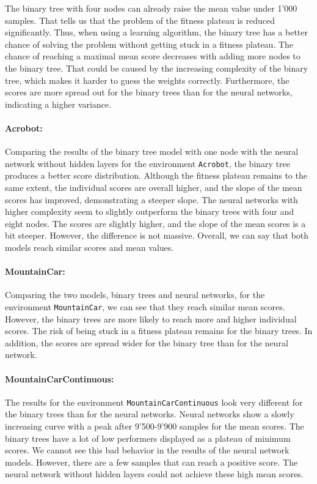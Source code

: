 The binary tree with four nodes can already raise the mean value under 1'000 samples. That tells us that the problem of the fitness plateau is reduced significantly. Thus, when using a learning algorithm, the binary tree has a better chance of solving the problem without getting stuck in a fitness plateau. The chance of reaching a maximal mean score decreases with adding more nodes to the binary tree. That could be caused by the increasing complexity of the binary tree, which makes it harder to guess the weights correctly. Furthermore, the scores are more spread out for the binary trees than for the neural networks, indicating a higher variance.

\paragraph*{Acrobot:} Comparing the results of the binary tree model with one node with the neural network without hidden layers for the environment \verb|Acrobot|, the binary tree produces a better score distribution. Although the fitness plateau remains to the same extent, the individual scores are overall higher, and the slope of the mean scores has improved, demonstrating a steeper slope. The neural networks with higher complexity seem to slightly outperform the binary trees with four and eight nodes. The scores are slightly higher, and the slope of the mean scores is a bit steeper. However, the difference is not massive. Overall, we can say that both models reach similar scores and mean values.

\paragraph*{MountainCar:} Comparing the two models, binary trees and neural networks, for the environment \verb|MountainCar|, we can see that they reach similar mean scores. However, the binary trees are more likely to reach more and higher individual scores. The risk of being stuck in a fitness plateau remains for the binary trees. In addition, the scores are spread wider for the binary tree than for the neural network.

\paragraph*{MountainCarContinuous:} The results for the environment \verb|MountainCarContinuous| look very different for the binary trees than for the neural networks. Neural networks show a slowly increasing curve with a peak after 9'500-9'900 samples for the mean scores. The binary trees have a lot of low performers displayed as a plateau of minimum scores. We cannot see this bad behavior in the results of the neural network models. However, there are a few samples that can reach a positive score. The neural network without hidden layers could not achieve these high mean scores.

